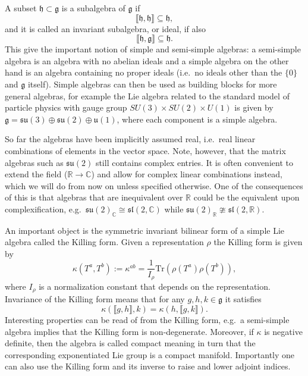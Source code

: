 A subset $\mathfrak{h}\subset \mathfrak{g}$ is a subalgebra of $\mathfrak{g}$ if \begin{equation}
    \llbracket\mathfrak{h},\mathfrak{h}\rrbracket\subseteq \mathfrak{h},
\end{equation} 
and it is called an invariant subalgebra, or ideal, if also
\begin{equation}
    \llbracket\mathfrak{h},\mathfrak{g}\rrbracket\subseteq \mathfrak{h}.
\end{equation}
This give the important notion of simple and semi-simple algebras: a semi-simple algebra is an algebra with no abelian ideals and a simple algebra on the other hand is an algebra containing no proper ideals (i.e.\ no ideals other than the $\{0\}$ and $\mathfrak{g}$ itself). Simple algebras can then be used as building blocks for more general algebras, for example the Lie algebra related to the standard model of particle physics with gauge group $SU(3)\times SU(2)\times U(1)$ is given by $\mathfrak{g}=\mathfrak{su}(3)\oplus\mathfrak{su}(2)\oplus\mathfrak{u}(1)$, where each component is a simple algebra. 

So far the algebras have been implicitly assumed real, i.e.\ real linear combinations of elements in the vector space. Note, however, that the matrix algebras such as $\mathfrak{su}(2)$ still contains complex entries. It is often convenient to extend the field ($\mathbb{R}\to\mathbb{C}$) and allow for complex linear combinations instead, which we will do from now on unless specified otherwise. One of the consequences of this is that algebras that are inequivalent over $\mathbb{R}$ could be the equivalent upon complexification, e.g.\ $\mathfrak{su}(2)_\mathbb{C}\cong \mathfrak{sl}(2,\mathbb{C})$ while $\mathfrak{su}(2)_\mathbb{R}\ncong\mathfrak{sl}(2,\mathbb{\mathbb{R}})$. 

An important object is the symmetric invariant bilinear form of a simple Lie algebra called the Killing form. Given a representation $\rho$ the Killing form is given by 
\begin{equation}
    \kappa(T^a,T^b) := \kappa^{ab} = \frac{1}{I_\rho}\text{Tr}\left(\rho(T^a)\rho(T^b)\right),
\end{equation}
where $I_\rho$ is a normalization constant that depends on the representation. Invariance of the Killing form means that for any $g,h,k\in\mathfrak{g}$ it satisfies 
\begin{equation}
    \kappa(\llbracket g,h\rrbracket,k) = \kappa(h,\llbracket g,k\rrbracket). 
\end{equation}
Interesting properties can be read of from the Killing form, e.g.\ a semi-simple algebra implies that the Killing form is non-degenerate. Moreover, if $\kappa$ is negative definite, then the algebra is called compact meaning in turn that the corresponding exponentiated Lie group is a compact manifold. Importantly one can also use the Killing form and its inverse to raise and lower adjoint indices. 



